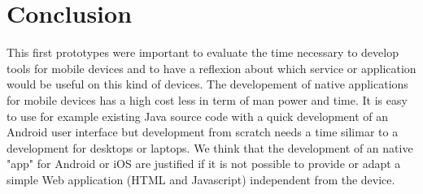 \section{Conclusion}
This first prototypes were important to evaluate the time necessary to develop tools for mobile devices and to have a reflexion about which service or application would be useful on this kind of devices. The developement of native applications for mobile devices has a high cost less in term of man power and time. It is easy to use for example existing Java source code with a quick development of an Android user interface but development from scratch needs a time silimar to a development for desktops or laptops. We think that the development of an native "app" for Android or iOS are justified if it is not possible to provide or adapt a simple Web application (HTML and Javascript) independent from the device.


